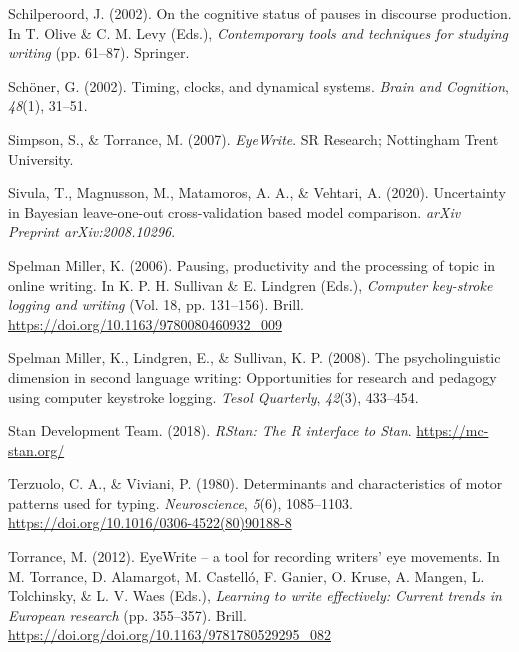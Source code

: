 \documentclass[
  man,floatsintext]{apa7}
\newlength{\cslhangindent}
\newlength{\cslentryspacingunit} %
\newenvironment{CSLReferences}[2] %
 {%
  \setlength{\parindent}{0pt}
  \ifodd #1
  \let\oldpar\par
  \def\par{\hangindent=\cslhangindent\oldpar}
  \fi
  \setlength{\parskip}{#2\cslentryspacingunit}
 }%
 {}
\begin{document}
\begin{CSLReferences}{1}{0}
\leavevmode{}%
Schilperoord, J. (2002). On the cognitive status of pauses in discourse production. In T. Olive \& C. M. Levy (Eds.), \emph{Contemporary tools and techniques for studying writing} (pp. 61--87). Springer.

\leavevmode{}%
Schöner, G. (2002). Timing, clocks, and dynamical systems. \emph{Brain and Cognition}, \emph{48}(1), 31--51.

\leavevmode{}%
Simpson, S., \& Torrance, M. (2007). \emph{EyeWrite}. SR Research; Nottingham Trent University.

\leavevmode{}%
Sivula, T., Magnusson, M., Matamoros, A. A., \& Vehtari, A. (2020). Uncertainty in {B}ayesian leave-one-out cross-validation based model comparison. \emph{arXiv Preprint arXiv:2008.10296}.

\leavevmode{}%
Spelman Miller, K. (2006). Pausing, productivity and the processing of topic in online writing. In K. P. H. Sullivan \& E. Lindgren (Eds.), \emph{Computer key-stroke logging and writing} (Vol. 18, pp. 131--156). Brill. \url{https://doi.org/10.1163/9780080460932_009}

\leavevmode{}%
Spelman Miller, K., Lindgren, E., \& Sullivan, K. P. (2008). The psycholinguistic dimension in second language writing: Opportunities for research and pedagogy using computer keystroke logging. \emph{Tesol Quarterly}, \emph{42}(3), 433--454.

\leavevmode{}%
Stan Development Team. (2018). \emph{{RStan}: The {R} interface to {Stan}}. \url{https://mc-stan.org/}

\leavevmode{}%
Terzuolo, C. A., \& Viviani, P. (1980). Determinants and characteristics of motor patterns used for typing. \emph{Neuroscience}, \emph{5}(6), 1085--1103. \url{https://doi.org/10.1016/0306-4522(80)90188-8}

\leavevmode{}%
Torrance, M. (2012). EyeWrite -- a tool for recording writers' eye movements. In M. Torrance, D. Alamargot, M. Castelló, F. Ganier, O. Kruse, A. Mangen, L. Tolchinsky, \& L. V. Waes (Eds.), \emph{Learning to write effectively: Current trends in {E}uropean research} (pp. 355--357). Brill. \url{https://doi.org/doi.org/10.1163/9781780529295_082}


\end{CSLReferences}
\end{document}
